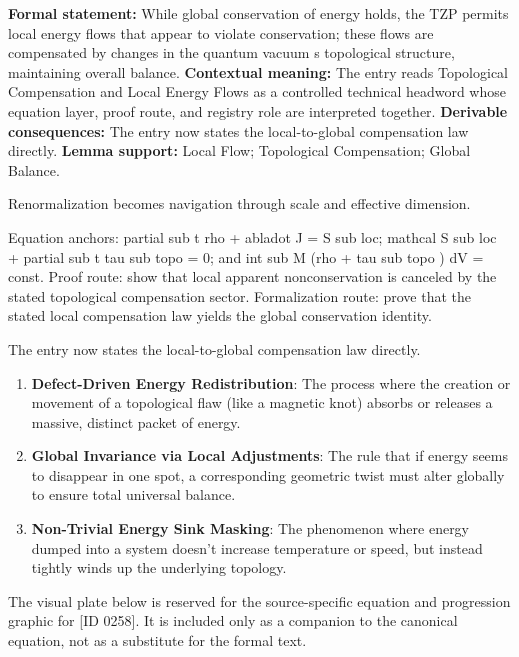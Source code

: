 \begingroup\footnotesize\setlength{\emergencystretch}{3em}\sloppy
\textbf{Formal statement:} While global conservation of energy holds, the TZP permits local energy flows that appear to violate conservation; these flows are compensated by changes in the quantum vacuum s topological structure, maintaining overall balance. \textbf{Contextual meaning:} The entry reads Topological Compensation and Local Energy Flows as a controlled technical headword whose equation layer, proof route, and registry role are interpreted together. \textbf{Derivable consequences:} The entry now states the local-to-global compensation law directly. \textbf{Lemma support:} Local Flow; Topological Compensation; Global Balance.\par
\endgroup

Renormalization becomes navigation through scale and effective dimension.

Equation anchors: partial sub t rho + abladot J = S sub loc; mathcal S sub loc + partial sub t tau sub topo = 0; and int sub M (rho + tau sub topo ) dV = const. Proof route: show that local apparent nonconservation is canceled by the stated topological compensation sector. Formalization route: prove that the stated local compensation law yields the global conservation identity.

The entry now states the local-to-global compensation law directly.
\endgroup

\begin{enumerate}[leftmargin=1.6em,itemsep=6pt,topsep=4pt]
\item \textbf{Defect-Driven Energy Redistribution}: The process where the creation or movement of a topological flaw (like a magnetic knot) absorbs or releases a massive, distinct packet of energy.
\item \textbf{Global Invariance via Local Adjustments}: The rule that if energy seems to disappear in one spot, a corresponding geometric twist must alter globally to ensure total universal balance.
\item \textbf{Non-Trivial Energy Sink Masking}: The phenomenon where energy dumped into a system doesn't increase temperature or speed, but instead tightly winds up the underlying topology.
\end{enumerate}

\begingroup\footnotesize\sloppy
The visual plate below is reserved for the source-specific equation and progression graphic for [ID 0258]. It is included only as a companion to the canonical equation, not as a substitute for the formal text.
\par\endgroup
\ifTZPDarkEdition
{}
\fi

